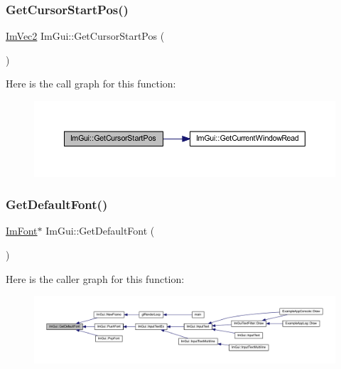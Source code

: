 \subsubsection{\texorpdfstring{Get\+Cursor\+Start\+Pos()}{GetCursorStartPos()}}
{\footnotesize\ttfamily \mbox{\hyperlink{struct_im_vec2}{Im\+Vec2}} Im\+Gui\+::\+Get\+Cursor\+Start\+Pos (\begin{DoxyParamCaption}{ }\end{DoxyParamCaption})}

Here is the call graph for this function\+:
\nopagebreak
\begin{figure}[H]
\begin{center}
\leavevmode
\includegraphics[width=350pt]{namespace_im_gui_a8ee9647de3b39fc7b77395082fc9e0cc_cgraph}
\end{center}
\end{figure}
\mbox{\label{namespace_im_gui_a78aef54ecb95954deefaca2e850148a3}} 
\subsubsection{\texorpdfstring{Get\+Default\+Font()}{GetDefaultFont()}}
{\footnotesize\ttfamily \mbox{\hyperlink{struct_im_font}{Im\+Font}}$\ast$ Im\+Gui\+::\+Get\+Default\+Font (\begin{DoxyParamCaption}{ }\end{DoxyParamCaption})\hspace{0.3cm}{\ttfamily [inline]}}

Here is the caller graph for this function\+:
\nopagebreak
\begin{figure}[H]
\begin{center}
\leavevmode
\includegraphics[width=350pt]{namespace_im_gui_a78aef54ecb95954deefaca2e850148a3_icgraph}
\end{center}
\end{figure}
\mbox{\label{namespace_im_gui_a1756b37d61154de489f1520179b4e294}} 

